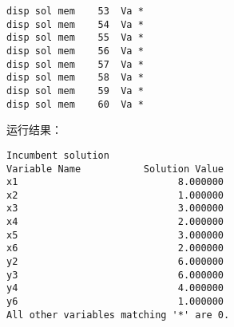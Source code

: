 \documentclass[11pt,a4paper]{article}
\begin{document}
\begin{CJK}{UTF8}{gkai}
\begin{verbatim}
disp sol mem	53	Va *
disp sol mem	54	Va *
disp sol mem	55	Va *
disp sol mem	56	Va *
disp sol mem	57	Va *
disp sol mem	58	Va *
disp sol mem	59	Va *
disp sol mem	60	Va *
	\end{verbatim}
	运行结果：
	\begin{verbatim}
Incumbent solution
Variable Name           Solution Value
x1                            8.000000
x2                            1.000000
x3                            3.000000
x4                            2.000000
x5                            3.000000
x6                            2.000000
y2                            6.000000
y3                            6.000000
y4                            4.000000
y6                            1.000000
All other variables matching '*' are 0.
	\end{verbatim}

\end{CJK}
\end{document}
